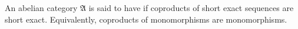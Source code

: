 An abelian category $\mathfrak{A}$ is said to have  if coproducts of short exact sequences are short exact. Equivalently, coproducts of monomorphisms are monomorphisms.

